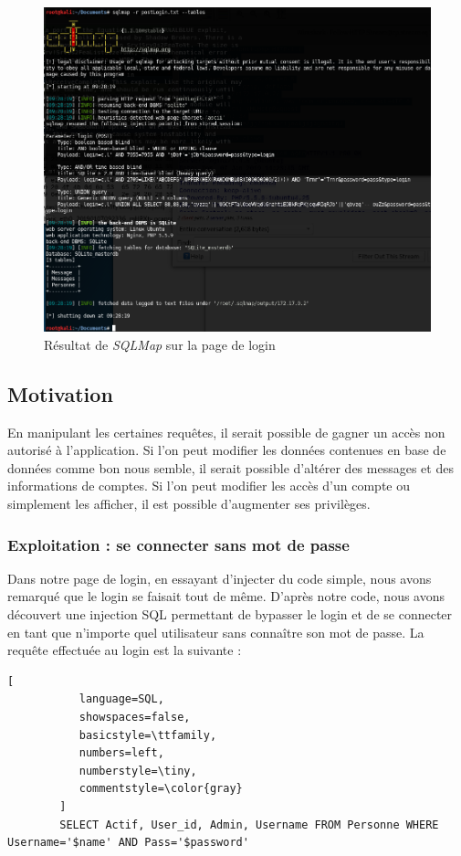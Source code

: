 \documentclass[12pt]{article}
\begin{document}
\begin{figure}[H]
\centering
\includegraphics[width=\linewidth]{images/sqli.png}
\caption{Résultat de \textit{SQLMap} sur la page de login}
\end{figure}

\subsection{Motivation}
En manipulant les certaines requêtes, il serait possible de gagner un accès non autorisé à l'application. Si l'on peut modifier les données contenues en base de données comme bon nous semble, il serait possible d'altérer des messages et des informations de comptes. Si l'on peut modifier les accès d'un compte ou simplement les afficher, il est possible d'augmenter ses privilèges.
\subsubsection{Exploitation : se connecter sans mot de passe}
Dans notre page de login, en essayant d'injecter du code simple, nous avons remarqué que le login se faisait tout de même. D'après notre code, nous avons découvert une injection SQL permettant de bypasser le login et de se connecter en tant que n'importe quel utilisateur sans connaître son mot de passe. La requête effectuée au login est la suivante :

\begin{lstlisting}[
           language=SQL,
           showspaces=false,
           basicstyle=\ttfamily,
           numbers=left,
           numberstyle=\tiny,
           commentstyle=\color{gray}
        ]
        SELECT Actif, User_id, Admin, Username FROM Personne WHERE Username='$name' AND Pass='$password'
\end{lstlisting}
\end{document}
